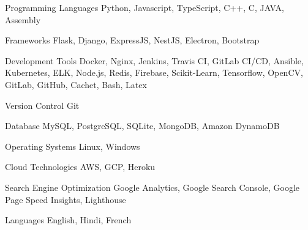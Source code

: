 

\begin{cvskills}

  \cvskill
    {Programming Languages} %
    {Python, Javascript, TypeScript, C++, C, JAVA, Assembly} %
    
  \cvskill
    {Frameworks} %
    {Flask, Django, ExpressJS, NestJS, Electron, Bootstrap} %

  \cvskill
    {Development Tools} %
    {Docker, Nginx, Jenkins, Travis CI, GitLab CI/CD, Ansible, Kubernetes, ELK, Node.js, Redis, Firebase, Scikit-Learn, Tensorflow, OpenCV, GitLab, GitHub, Cachet, Bash, Latex} %
    
  \cvskill
    {Version Control} %
    {Git} %
    
  \cvskill
    {Database} %
    {MySQL, PostgreSQL, SQLite, MongoDB, Amazon DynamoDB} %

  \cvskill
    {Operating Systems} %
    {Linux, Windows} %

  \cvskill
    {Cloud Technologies} %
    {AWS, GCP, Heroku} %

  \cvskill
    {Search Engine Optimization} %
    {Google Analytics, Google Search Console, Google Page Speed Insights, Lighthouse} %
    
  \cvskill
    {Languages} %
    {English, Hindi, French} %

\end{cvskills}
